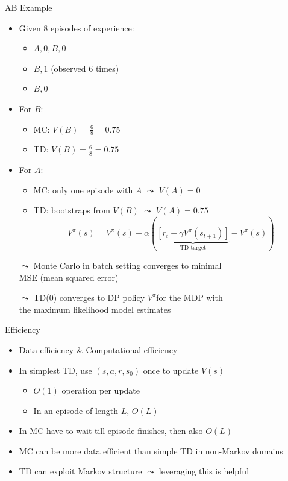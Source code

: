 \begin{frame}[c]{AB Example }
	
\begin{itemize}
	\item Given $8$ episodes of experience:
	\begin{itemize}
		\item $A, 0, B, 0$
		\item $B, 1$ (observed $6$ times)
		\item $B, 0$ 
	\end{itemize}
	\item For $B$:
	\begin{itemize}
		\item MC: $V(B) = \frac{6}{8} =  0.75$
		\item TD: $V(B) = \frac{6}{8} =  0.75$
	\end{itemize} 
	\pause
	\item For $A$:
	\begin{itemize}
		\item MC: only one episode with $A$ $\leadsto$ $V(A) = 0$ 
		\item TD: bootstraps from $V(B)$ $\leadsto$ $V(A) = 0.75$
$$ V^\pi(s) = V^\pi(s) + \alpha (\underbrace{[r_t + \gamma V^\pi (s_{t+1})]}_{\text{TD target}} - V^\pi(s))$$
	\end{itemize}	
	\medskip
	\item[$\leadsto$] Monte Carlo in batch setting converges to minimal\\ \alert{MSE} (mean squared error)
	\item[$\leadsto$] TD(0) converges to DP policy $V^\pi$for the MDP with\\ the \alert{maximum likelihood model estimates}
	
\end{itemize}
	
\end{frame}
\begin{frame}[c]{Efficiency}
	
	\begin{itemize}
		\item Data efficiency \& Computational efficiency
		\item In simplest TD, use $(s,a,r,s_0)$ once to update $V(s)$
		\begin{itemize}
			\item $O(1)$ operation per update
			\item In an episode of length $L$, $O(L)$
		\end{itemize}		
		\item In MC have to wait till episode finishes, then also $O(L)$
		\item MC can be more data efficient than simple TD in non-Markov domains
		\item TD can exploit Markov structure $\leadsto$ leveraging this is helpful
	\end{itemize}
	
\end{frame}
